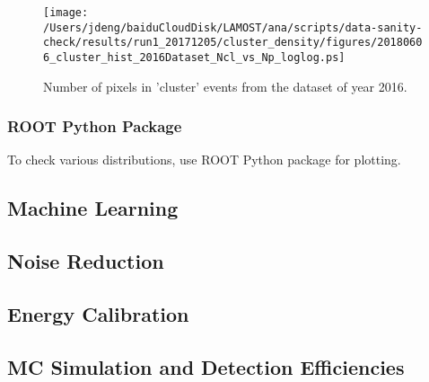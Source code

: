 \documentclass[12pt,twoside,letterpaper]{article}
\begin{document}
   \begin{figure}[!htbp]
   \begin{center}
       \texttt{[image: /Users/jdeng/baiduCloudDisk/LAMOST/ana/scripts/data-sanity-check/results/run1\_20171205/cluster\_density/figures/20180606\_cluster\_hist\_2016Dataset\_Ncl\_vs\_Np\_loglog.ps]}
       \caption{Number of pixels in 'cluster' events from the dataset of year 2016.}  
       \label{Fig:CluVsPix}
   \end{center}    
   \end{figure}



\subsubsection{ROOT Python Package}
To check various distributions, use ROOT Python package for plotting.


\subsection{Machine Learning} 

\subsection{Noise Reduction} 

\subsection{Energy Calibration} 

\subsection{MC Simulation and Detection Efficiencies} 
\end{document}
